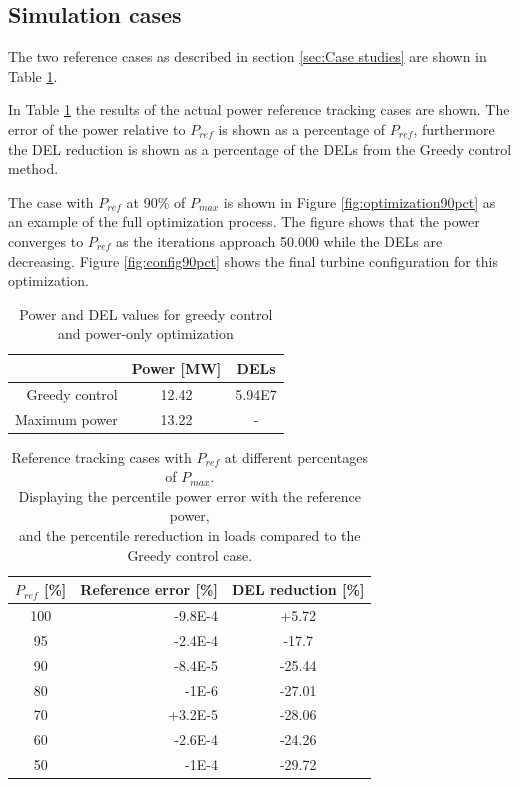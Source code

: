 \subsection{Simulation cases} \label{sec:Simulation cases}
The two reference cases as described in section \ref{sec:Case studies} are shown in Table \ref{tab:reference results}. 

In Table \ref{tab:reference results} the results of the actual power reference tracking cases are shown. The error of the power relative to $P_{ref}$ is shown as a percentage of $P_{ref}$, furthermore the DEL reduction is shown as a percentage of the DELs from the Greedy control method. 

The case with $P_{ref}$ at 90\% of $P_{max}$ is shown in Figure \ref{fig:optimization90pct} as an example of the full optimization process. The figure shows that the power converges to $P_{ref}$ as the iterations approach 50.000 while the DELs are decreasing. Figure \ref{fig:config90pct} shows the final turbine configuration for this optimization. 

\begin{table}[p]
	\caption{Power and DEL values for greedy control and power-only optimization}
	\centering
	\label{tab:reference results}
	\begin{tabular}{rcc}
		\hline
		& Power [MW] & DELs \\ 
		\hline
		Greedy control & 12.42 & 5.94E7 \\
		Maximum power & 13.22 & - \\
	\end{tabular}
\end{table}

\begin{table}[p]
	\caption{Reference tracking cases with $P_{ref}$ at different percentages of $P_{max}$.\\	
		Displaying the percentile power error with the reference power, \\
		and the percentile rereduction in loads compared to the Greedy control case.}
	\centering
	\label{tab:downgrade results}
	\begin{tabular}{crc}
		\hline
		$P_{ref}$ [\%]& Reference error [\%] & DEL reduction [\%]\\
		\hline
		100 & -9.8E-4 & +5.72 \\
		95 & -2.4E-4 & -17.7 \\
		90 & -8.4E-5 & -25.44 \\ %
		80 & -1E-6 & -27.01 \\ %
		70 & +3.2E-5 & -28.06 \\ %
		60 & -2.6E-4 & -24.26 \\ %
		50 & -1E-4 & -29.72 \\ %
	\end{tabular}
\end{table}

